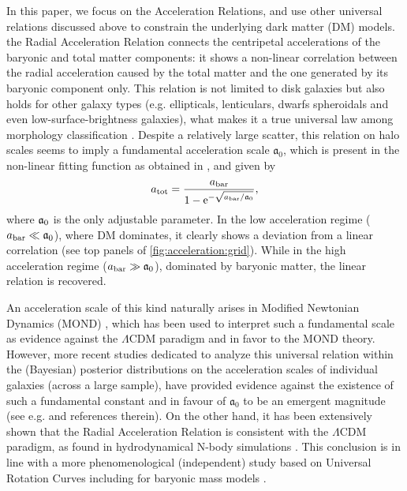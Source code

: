 In this paper, we focus 
on the  Acceleration Relations, 
and use other universal relations discussed above to constrain the underlying dark matter (DM) models.  the Radial Acceleration Relation connects the centripetal accelerations of the baryonic and total matter components: it shows a non-linear correlation between the radial acceleration caused by the total matter and the one generated by its baryonic component only. 
This relation is not limited to disk galaxies 
but also holds for other galaxy types (e.g. ellipticals, lenticulars, dwarfs spheroidals and even low-surface-brightness galaxies), what makes it a true universal law among morphology classification \citep{2016PhRvL.117t1101M,2017ApJ...836..152L,2019ApJ...873..106D}. Despite a relatively large scatter, this relation on halo scales seems to imply a fundamental acceleration scale $\mathfrak{a}_0$, which is present in the non-linear fitting function as obtained in \cite{2016PhRvL.117t1101M}, and given by
%
\begin{equation}
	\label{eq:mcgaugh-fit}
	\SYMatot = \frac{\SYMabar}{1 - \e^{-\sqrt{\SYMabar/{\SYMafrak}}}},
\end{equation} 
%
where $\mathfrak{a}_0$ is the only adjustable parameter. In the low acceleration regime ($a_\mathrm{bar} \ll \mathfrak{a}_0$), where DM dominates, it clearly shows a deviation from a linear correlation (see top panels of \cref{fig:acceleration:grid}). While in the high acceleration regime ($a_\mathrm{bar} \gg \mathfrak{a}_0$), dominated by baryonic matter, the linear relation is recovered.

An acceleration scale of this kind naturally arises in Modified Newtonian Dynamics (MOND) \citep{2015CaJPh..93..169K,2016arXiv160906642M,2016PhRvL.117t1101M,2018A&A...615A...3L},
which has been used to interpret such a fundamental scale as evidence against the $\Lambda$CDM paradigm and in favor to the MOND theory. However, more recent studies dedicated to analyze this universal relation within the (Bayesian) posterior distributions on the acceleration scales of individual galaxies (across a large sample), have provided evidence against the existence of such a fundamental constant and in favour of $\mathfrak{a}_0$ to be an emergent magnitude (see e.g. \citealp{2020MNRAS.494.2875M} and references therein). On the other hand, it has been extensively shown that the Radial Acceleration Relation is consistent with the $\Lambda$CDM paradigm, as found in hydrodynamical N-body simulations  \citep{2016MNRAS.456L.127D,2017MNRAS.471.1841N,2017PhRvL.118p1103L,2019MNRAS.485.1886D}. This conclusion is in line with a more phenomenological (independent) study based on Universal Rotation Curves including for baryonic mass models \citep{2018FoPh...48.1517S}.

